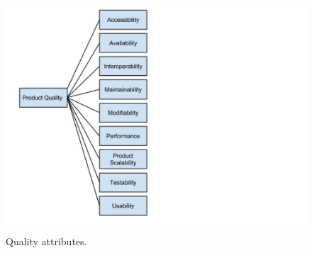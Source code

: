 \begin{figure}[!h]
    \begin{center}
    \includegraphics[scale=0.4]{images/qualityAttributes.jpg}
    \caption{Quality attributes.}
    \label{img:qualityAttributes}
    \end{center}
\end{figure}